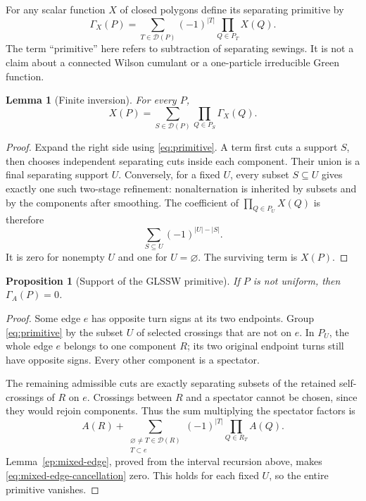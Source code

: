 \documentclass[11pt,letterpaper]{article}
\numberwithin{equation}{section}
\newtheorem{lemma}[theorem]{Lemma}
\newtheorem{proposition}[theorem]{Proposition}
\theoremstyle{definition}
\theoremstyle{remark}
\newcommand{\Dcal}{\mathcal D}
\begin{document}
For any scalar function \(X\) of closed polygons define its separating
primitive by
\begin{equation}
 \Gamma_X(P)=\sum_{T\in\Dcal(P)}(-1)^{|T|}
                    \prod_{Q\in P_T}X(Q).
 \label{eq:primitive}
\end{equation}
The term ``primitive'' here refers to subtraction of separating sewings.
It is not a claim about a connected Wilson cumulant or a one-particle
irreducible Green function.

\begin{lemma}[Finite inversion]
\label{lem:inversion}
For every \(P\),
\begin{equation}
 X(P)=\sum_{S\in\Dcal(P)}\prod_{Q\in P_S}\Gamma_X(Q).
 \label{eq:inversion}
\end{equation}
\end{lemma}
\begin{proof}
Expand the right side using \eqref{eq:primitive}. A term first cuts a
support \(S\), then chooses independent separating cuts inside each
component. Their union is a final separating support \(U\). Conversely,
for a fixed \(U\), every subset \(S\subseteq U\) gives exactly one such
two-stage refinement: nonalternation is inherited by subsets and by the
components after smoothing. The coefficient of
\(\prod_{Q\in P_U}X(Q)\) is therefore
\begin{equation}
 \sum_{S\subseteq U}(-1)^{|U|-|S|}.
 \label{eq:boolean-cancellation}
\end{equation}
It is zero for nonempty \(U\) and one for \(U=\varnothing\). The surviving
term is \(X(P)\).
\end{proof}

\begin{proposition}[Support of the GLSSW primitive]
\label{prop:nonuniform}
If \(P\) is not uniform, then \(\Gamma_A(P)=0\).
\end{proposition}
\begin{proof}
Some edge \(e\) has opposite turn signs at its two endpoints. Group
\eqref{eq:primitive} by the subset \(U\) of selected crossings that are
not on \(e\). In \(P_U\), the whole edge \(e\) belongs to one component
\(R\); its two original endpoint turns still have opposite signs.
Every other component is a spectator.

The remaining admissible cuts are exactly separating subsets of the
retained self-crossings of \(R\) on \(e\). Crossings between \(R\) and a
spectator cannot be chosen, since they would rejoin components. Thus the
sum multiplying the spectator factors is
\begin{equation}
 A(R)+
 \sum_{\substack{\varnothing\ne T\in\Dcal(R)\\T\subset e}}
       (-1)^{|T|}\prod_{Q\in R_T}A(Q).
 \label{eq:mixed-edge-cancellation}
\end{equation}
Lemma~\ref{ep:mixed-edge}, proved from the interval recursion above, makes
\eqref{eq:mixed-edge-cancellation} zero. This holds for each fixed \(U\),
so the entire primitive vanishes.
\end{proof}
\end{document}
